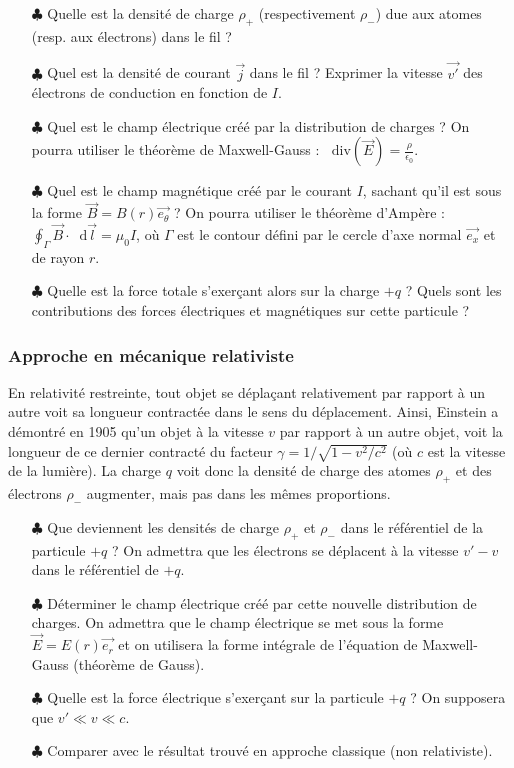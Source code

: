 \documentclass{report}
\newcommand*\dif{\mathop{}\!\mathrm{d}}
\newcommand*\diver{\mathop{}\!\mathrm{div}}
\begin{document}
\begin{itemize}
	\item[$\clubsuit$] Quelle est la densité de charge $\rho_{+}$ (respectivement $\rho_{-}$) due aux atomes (resp. aux électrons) dans le fil ? 
	
	\item[$\clubsuit$] Quel est la densité de courant $\vec{j}$ dans le fil ? Exprimer la vitesse $\vec{v'}$ des électrons de conduction en fonction de $I$.
	
	\item[$\clubsuit$] Quel est le champ électrique créé par la distribution de charges ? On pourra utiliser le théorème de Maxwell-Gauss : $\diver(\vec{E})=\frac{\rho}{\epsilon_0}$.
	\item[$\clubsuit$] Quel est le champ magnétique créé par le courant $I$, sachant qu'il est sous la forme $\vec{B}=B(r)\vec{e_\theta}$ ? On pourra utiliser le théorème d'Ampère : $\oint_\Gamma \vec{B}\cdot \dif\vec{l}=\mu_0I$, où $\Gamma$ est le contour défini par le cercle d'axe normal $\vec{e_x}$ et de rayon $r$.
		\item[$\clubsuit$] Quelle est la force totale s'exerçant alors sur la charge $+q$ ? Quels sont les contributions des forces électriques et magnétiques sur cette particule ?
\end{itemize}

\subsubsection*{Approche en mécanique relativiste}

En relativité restreinte, tout objet se déplaçant relativement par rapport à un autre voit sa longueur contractée dans le sens du déplacement. Ainsi, Einstein a démontré en 1905 qu'un objet à la vitesse $v$ par rapport à un autre objet, voit la longueur de ce dernier contracté du facteur $\gamma=1/\sqrt{1-v^{2}/c^{2}}$ (où $c$ est la vitesse de la lumière). La charge $q$ voit donc la densité de charge des atomes $\rho_+$ et des électrons $\rho_-$ augmenter, mais pas dans les mêmes proportions. 
	\begin{itemize}
		\item[$\clubsuit$] Que deviennent les densités de charge $\rho_{+}$ et $\rho_{-}$ dans le référentiel de la particule $+q$ ? On admettra que les électrons se déplacent à la vitesse $v'-v$ dans le référentiel de $+q$. 
		\item[$\clubsuit$] Déterminer le champ électrique créé par cette nouvelle distribution de charges. On admettra que le champ électrique se met sous la forme $\vec{E}=E(r)\vec{e_r}$ et on utilisera la forme intégrale de l'équation de Maxwell-Gauss (théorème de Gauss).
		\item[$\clubsuit$] Quelle est la force électrique s'exerçant sur la particule $+q$ ? On supposera que $v'\ll v\ll c$.
		\item[$\clubsuit$] Comparer avec le résultat trouvé en approche classique (non relativiste).
	\end{itemize}
			
\end{document}
